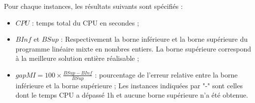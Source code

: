 {Pour chaque instances, les résultats suivants sont spécifiés :
\begin{itemize}[label=$\square$]
	\item $CPU$ : temps total du CPU en secondes ;
	\item $BInf$ et $BSup$ : Respectivement la borne inférieure et la borne supérieure du programme linéaire mixte en nombres entiers. La borne supérieure correspond à la meilleure solution entière réalisable ;
	\item $gapMI=100 \times \frac{BSup-BInf}{BSup}$ : pourcentage de l'erreur relative entre la borne inférieure et la borne supérieure ; 
	Les instances indiquées par "-" sont celles dont le temps CPU a dépassé 1h et aucune borne supérieure n'a été obtenue. %
	
\end{itemize}

}
